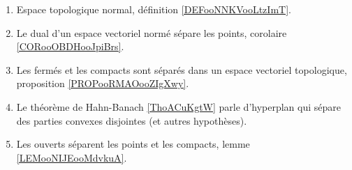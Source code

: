 \begin{enumerate}
	\item
	      Espace topologique normal, définition \ref{DEFooNNKVooLtzImT}.
	\item
	      Le dual d'un espace vectoriel normé sépare les points, corolaire \ref{CORooOBDHooJpiBrs}.
	\item
	      Les fermés et les compacts sont séparés dans un espace vectoriel topologique, proposition \ref{PROPooRMAOooZIgXwy}.
	\item
	      Le théorème de Hahn-Banach \ref{ThoACuKgtW} parle d'hyperplan qui sépare des parties convexes disjointes (et autres hypothèses).
	\item
	      Les ouverts séparent les points et les compacts, lemme \ref{LEMooNIJEooMdvkuA}.
\end{enumerate}
